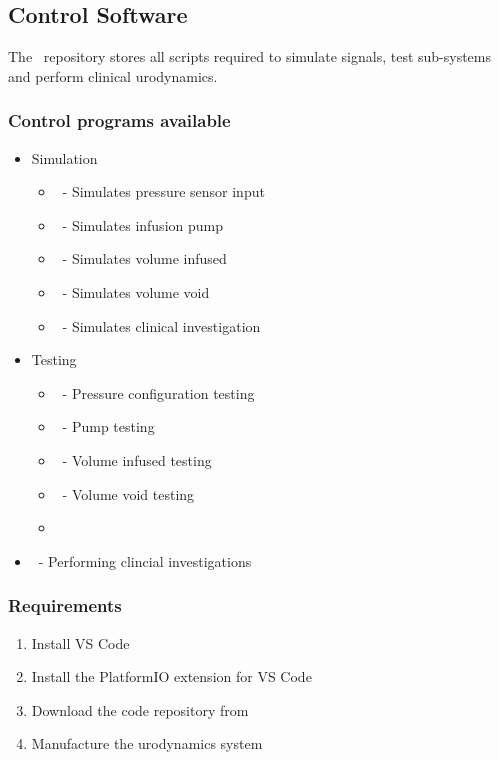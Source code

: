 \subsection{Control Software}

The \hardwareswrepo \ repository stores all scripts required to simulate signals, test sub-systems and perform clinical urodynamics. 

\subsubsection{Control programs available}
\begin{itemize}
    \item Simulation
    \begin{itemize}
        \item \pressuresimrepo \ - Simulates pressure sensor input
        \item \pumpsimrepo \ - Simulates infusion pump
        \item \visimrepo \ - Simulates volume infused
        \item \vvsimrepo \ - Simulates volume void
        \item \investigationsimrepo \ - Simulates clinical investigation
    \end{itemize}
    \item Testing
    \begin{itemize}
        \item \pressuretestrepo \ - Pressure configuration testing
        \item \pumptestrepo \ - Pump testing
        \item \vitestrepo \ - Volume infused testing
        \item \vvtestrepo \ - Volume void testing
        \item 
    \end{itemize}
    \item \fullclinicalrepo \ - Performing clincial investigations
\end{itemize}

\subsubsection{Requirements}
\begin{enumerate}
    \item Install VS Code
    \item Install the PlatformIO extension for VS Code
    \item Download the code repository from \hardwareswrepo
    \item Manufacture the urodynamics system
\end{enumerate}

